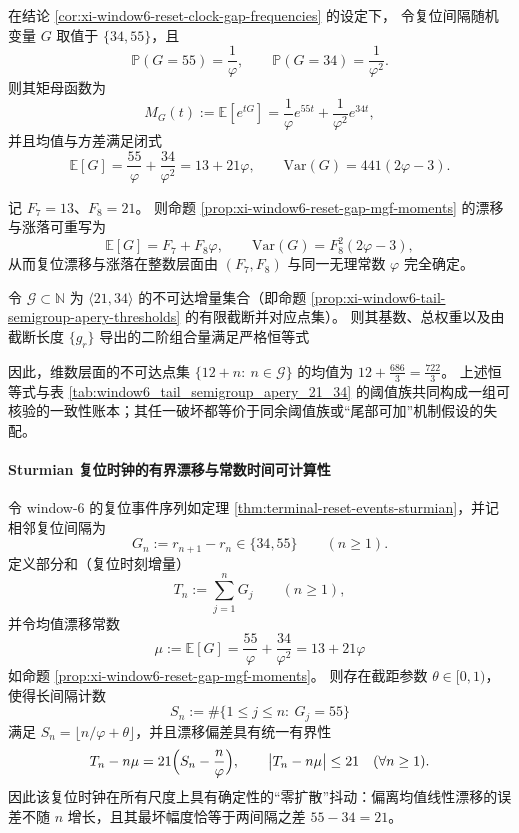 \begin{proposition}[两间隔复位时钟的显式矩不变量]\label{prop:xi-window6-reset-gap-mgf-moments}
在结论 \ref{cor:xi-window6-reset-clock-gap-frequencies} 的设定下，
令复位间隔随机变量 \(G\) 取值于 \(\{34,55\}\)，且
\[
\mathbb P(G=55)=\frac{1}{\varphi},\qquad \mathbb P(G=34)=\frac{1}{\varphi^2}.
\]
则其矩母函数为
\[
M_G(t):=\mathbb E[e^{tG}]
=\frac{1}{\varphi}e^{55t}+\frac{1}{\varphi^2}e^{34t},
\]
并且均值与方差满足闭式
\[
\mathbb E[G]=\frac{55}{\varphi}+\frac{34}{\varphi^2}=13+21\varphi,
\qquad
\mathrm{Var}(G)=441(2\varphi-3).
\]
\end{proposition}

\begin{corollary}\label{cor:xi-window6-reset-gap-fib-coupling}
记 \(F_7=13\)、\(F_8=21\)。
则命题 \ref{prop:xi-window6-reset-gap-mgf-moments} 的漂移与涨落可重写为
\[
\mathbb E[G]=F_7+F_8\varphi,
\qquad
\mathrm{Var}(G)=F_8^2(2\varphi-3),
\]
从而复位漂移与涨落在整数层面由 \((F_7,F_8)\) 与同一无理常数 \(\varphi\) 完全确定。
\end{corollary}

\begin{proposition}[不可达集合的质量不变量与二阶一致性账本]\label{prop:xi-window6-gap-ledger-invariants}
令 \(\mathcal G\subset\mathbb N\) 为 \(\langle 21,34\rangle\) 的不可达增量集合（即命题 \ref{prop:xi-window6-tail-semigroup-apery-thresholds} 的有限截断并对应点集）。
则其基数、总权重以及由截断长度 \(\{g_r\}\) 导出的二阶组合量满足严格恒等式

因此，维数层面的不可达点集 \(\{12+n:\ n\in\mathcal G\}\) 的均值为 \(12+\frac{686}{3}=\frac{722}{3}\)。
上述恒等式与表 \ref{tab:window6_tail_semigroup_apery_21_34} 的阈值族共同构成一组可核验的一致性账本；其任一破坏都等价于同余阈值族或“尾部可加”机制假设的失配。
\end{proposition}

\paragraph{Sturmian 复位时钟的有界漂移与常数时间可计算性}

\begin{proposition}\label{prop:xi-window6-reset-clock-bounded-drift}
令 window-\(6\) 的复位事件序列如定理 \ref{thm:terminal-reset-events-sturmian}，并记相邻复位间隔为
\[
G_n:=r_{n+1}-r_n\in\{34,55\}\qquad(n\ge 1).
\]
定义部分和（复位时刻增量）
\[
T_n:=\sum_{j=1}^{n}G_j\qquad(n\ge 1),
\]
并令均值漂移常数
\[
\mu:=\mathbb E[G]=\frac{55}{\varphi}+\frac{34}{\varphi^2}=13+21\varphi
\]
如命题 \ref{prop:xi-window6-reset-gap-mgf-moments}。
则存在截距参数 \(\theta\in[0,1)\)，使得长间隔计数
\[
S_n:=\#\{1\le j\le n:\ G_j=55\}
\]
满足 \(S_n=\lfloor n/\varphi+\theta\rfloor\)，并且漂移偏差具有统一有界性
\[
T_n-n\mu=21\Bigl(S_n-\frac{n}{\varphi}\Bigr),
\qquad
\bigl|T_n-n\mu\bigr|\le 21
\quad(\forall n\ge 1).
\]
因此该复位时钟在所有尺度上具有确定性的“零扩散”抖动：偏离均值线性漂移的误差不随 \(n\) 增长，且其最坏幅度恰等于两间隔之差 \(55-34=21\)。
\end{proposition}

